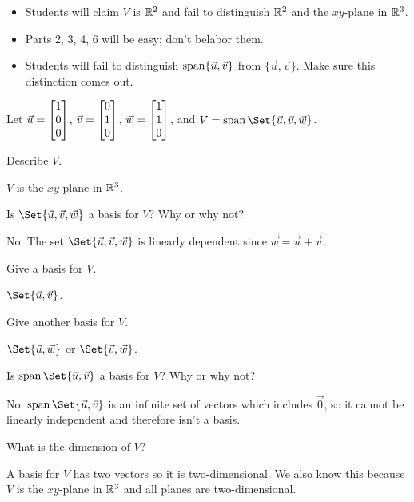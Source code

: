 \documentclass{workbook}
\begin{document}
\begin{slide}
\begin{annotation}
		\begin{notes}
			\begin{itemize}
				\item Students will claim $V$ is $\mathbb{R}^2$ and fail to distinguish
					$\mathbb{R}^2$ and the $xy$-plane in $\mathbb{R}^3$.
				\item Parts 2, 3, 4, 6 will be easy; don't belabor them.
				\item Students will fail to distinguish $\operatorname{span}\{\vec u,\vec v\}$
					from $\{\vec u,\vec v\}$. Make sure this distinction comes out.
			\end{itemize}
		\end{notes}
	\end{annotation}
	Let $\vec u=\mat{1\\0\\0}$, $\vec v=\mat{0\\1\\0}$, $\vec w=\mat{1\\1\\0}$,
	and $V=\Span\Set{\vec u,\vec v,\vec w}$.
	\begin{parts}
		\item Describe $V$.
			\begin{solution}[inline]
				$V$ is the $xy$-plane in $\mathbb{R}^3$.
			\end{solution}
		\item Is $\Set{\vec u,\vec v,\vec w}$ a basis for $V$?  Why or why not?
			\begin{solution}
				No. The set $\Set{\vec u,\vec v,\vec w}$ is linearly dependent since $\vec w=\vec u+\vec v$.
			\end{solution}
		\item Give a basis for $V$.
			\begin{solution}[inline]
				$\Set{\vec u,\vec v}$.
			\end{solution}
		\item Give another basis for $V$.
			\begin{solution}[inline]
				$\Set{\vec u,\vec w}$ or $\Set{\vec v,\vec w}$.
			\end{solution}
		\item Is $\Span\Set{\vec u,\vec v}$ a basis for $V$?  Why or why not?
			\begin{solution}
				No. $\Span\Set{\vec u,\vec v}$ is an infinite set of vectors
				which includes $\vec 0$, so it cannot be linearly independent and
				therefore isn't a basis.
			\end{solution}
		\item What is the dimension of $V$?
			\begin{solution}
				A basis for $V$ has two vectors so it is two-dimensional. We also
				know this because $V$ is the $xy$-plane in $\mathbb{R}^3$ and all planes
				are two-dimensional.
			\end{solution}
	\end{parts}

\end{slide}
\end{document}

